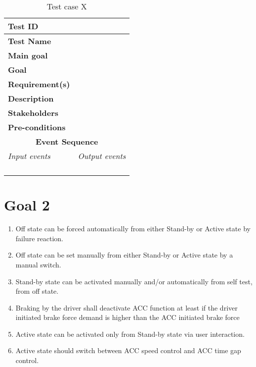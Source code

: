 \begin{table}[H]
\centering
\begin{tabularx}{\linewidth}{X|X}
  \hline
  \textbf{Test ID} & \\
  \hline
  \textbf{Test Name} &  \\
  \hline
  \textbf{Main goal} &  \\
  \hline
  \textbf{Goal} &  \\
  \hline
  \textbf{Requirement(s)} &  \\
  \hline
  \textbf{Description} &  \\
  \hline
  \textbf{Stakeholders} &  \\
  \hline
  \textbf{Pre-conditions} &  \\
  \hline
  \multicolumn{2}{c}{\textbf{Event Sequence}} \\
  \hline
  \textit{Input events} & \textit{Output events} \\
  \hline
   &  \\
  \hline
   &  \\
  \hline
   &  \\
  \hline
   &  \\
  \hline
  \end{tabularx}
\caption{\label{tab_caseX} Test case X}
\end{table}



\section{Goal 2}
\begin{enumerate}
    \item Off state can be forced automatically from either Stand-by or Active state by failure reaction.
    \item Off state can be set manually from either Stand-by or Active state by a manual switch.
    \item Stand-by state can be activated manually and/or automatically from self test, from off state.
    \item Braking by the driver shall deactivate ACC function at least if the driver initiated brake force demand is higher than the ACC initiated brake force
    
    
    \item Active state can be activated only from Stand-by state via user interaction.
    \item Active state should switch between ACC speed control and ACC time gap control.
\end{enumerate}

